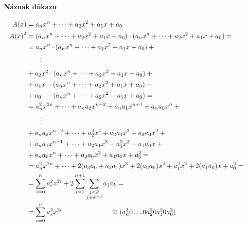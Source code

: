 \documentclass[thesis=M,czech,hidelinks]{FITthesis}[2012/06/26]
\newcommand{\0}{{\textcolor[gray]{0.80}{0}}}
\begin{document}
\paragraph{Náznak důkazu}
\begin{align*}
    A(x)     &=  a_n x^n + \dots + a_2 x^2 + a_1 x + a_0 \\
    {A(x)}^2 &=  (a_n x^n + \dots + a_2 x^2 + a_1 x + a_0)\cdot(a_n x^n + \dots + a_2 x^2 + a_1 x + a_0) =  \\
             &= a_n x^n   \cdot (a_n x^n + \dots + a_2 x^2 + a_1 x + a_0) + {}                              \\
             & \qquad \vdots                                                                                \\
             &  {} + a_2 x^2   \cdot (a_n x^n + \dots + a_2 x^2 + a_1 x + a_0) + {}                         \\
             &  {} + a_1 x \, \:  \cdot (a_n x^n + \dots + a_2 x^2 + a_1 x + a_0) + {}                      \\
             &  {} + a_0 \quad \cdot (a_n x^n + \dots + a_2 x^2 + a_1 x + a_0) =                            \\
             &= a_n^2 x^{2n}    + \dots + a_n a_2 x^{n+2} + a_n a_1 x^{n+1} + a_n a_0 x^n + {}              \\
             & \qquad \vdots                                                                                \\
             &  {} + a_n a_2 x^{n+2} + \dots + a_2^2 x^4       + a_2 a_1 x^3     + a_2 a_0 x^2 + {}         \\
             &  {} + a_n a_1 x^{n+1} + \dots + a_2 a_1 x^3     + a_1^2 x^2       + a_1 a_0 x   + {}         \\
             &  {} + a_n a_0 x^n     + \dots + a_2 a_0 x^2     + a_1 a_0 x       + a_0^2       =            \\
             &= a_n^2 x^{2n} + \dots  + 2 ( a_3 a_0 + a_2 a_1 ) x^3  + 2 ( a_2 a_0 ) x^2 + a_1^2 x^2 + 2 ( a_1 a_0 ) x + a_0^2 = \\
             &= \sum_{i=0}^{n} a_i^2 x^{2i} + 2 \sum_{i=1}^{n+1}\sum_{\substack{j<k \\ j+k = i}} a_j a_k =  \\
             &= \sum_{i=0}^{n} a_i^2 x^{2i}
    \hspace{2.5cm} \cong (a_n^2 0 \dots 0 a_2^2 0 a_1^2 0 a_0^2)
\end{align*}
\end{document}
